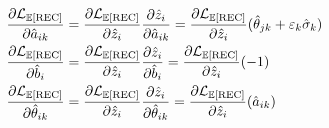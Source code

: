 \documentclass[letterpaper]{article}
\def \e{\ensuremath \varepsilon}
\theoremstyle{definition}
\begin{document}
\begin{equation}
  \begin{split}
  \frac{\partial \mathcal{L}_{\mathbb{E}[\text{REC}]}}{\partial \hat a_{ik}} &= 
  \frac{\partial \mathcal{L}_{\mathbb{E}[\text{REC}]}}{\partial \hat z_i}\frac{\partial \hat z_i}{\partial \hat a_{ik}} = \frac{\partial \mathcal{L}_{\mathbb{E}[\text{REC}]}}{\partial \hat z_i} (\hat \theta_{jk} + \e_k \hat \sigma_k) \\
  \frac{\partial \mathcal{L}_{\mathbb{E}[\text{REC}]}}{\partial \hat b_i} &= 
  \frac{\partial \mathcal{L}_{\mathbb{E}[\text{REC}]}}{\partial \hat z_i}\frac{\partial \hat z_i}{\partial \hat b_i} = \frac{\partial \mathcal{L}_{\mathbb{E}[\text{REC}]}}{\partial \hat z_i} (-1) \\
  \frac{\partial \mathcal{L}_{\mathbb{E}[\text{REC}]}}{\partial \hat \theta_{ik}} &= 
  \frac{\partial \mathcal{L}_{\mathbb{E}[\text{REC}]}}{\partial \hat z_i}\frac{\partial \hat z_i}{\partial \hat \theta_{ik}} = \frac{\partial \mathcal{L}_{\mathbb{E}[\text{REC}]}}{\partial \hat z_i} (\hat a_{ik}) 
\end{split}
 \label{eq:param_deriv}
\end{equation}
\end{document}
